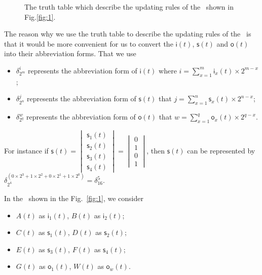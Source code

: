 \begin{example}
\begin{figure}[thpb]
      \caption{The truth table which describe the updating rules of the \BCN\ shown in Fig.\ref{fig:1}.}
      \label{fig:2}
   \end{figure}
  
   \label{exa:2}
\end{example}   

The reason why we use the truth table to describe the updating rules of the \BCN\ is that it would be more convenient for us to convert the $\mathsf{i}(t)$, $\mathsf{s}(t)$ and $\mathsf{o}(t)$ into their abbreviation forms. 
That we use 
\begin{itemize}
  \item $\delta^i_{2^m}$ represents the abbreviation form of $\mathsf{i}(t)$ where $i=\sum_{x=1}^m \mathsf{i}_{x}(t)\times 2^{m-x}$;
  \item $\delta^j_{2^n}$ represents the abbreviation form of $\mathsf{s}(t)$ that $j=\sum_{x=1}^n \mathsf{s}_{x}(t)\times 2^{n-x}$;
  \item $\delta^w_{2^q}$ represents the abbreviation form of $\mathsf{o}(t)$ that $w=\sum_{x=1}^q \mathsf{o}_{x}(t)\times 2^{q-x}$.
\end{itemize}

For instance if $\mathsf{s}(t)=\begin{vmatrix}\mathsf{s}_1(t)\\\mathsf{s}_2(t) \\ \mathsf{s}_3(t) \\\mathsf{s}_4(t)\end{vmatrix}=\begin{vmatrix}0\\1\\0\\1\end{vmatrix}$, then $\mathsf{s}(t)$ can be represented by $\delta^{(0\times2^3+1\times2^2+0\times2^1+1\times2^0)}_{2^4}=\delta^5_{16}$. 

In the \BCN\ shown in the Fig.~\ref{fig:1}, we consider 
\begin{itemize}
  \item $A(t)$ as $\mathsf{i}_{1}(t)$, $B(t)$ as $\mathsf{i}_{2}(t)$;
  \item $C(t)$ as $\mathsf{s}_{1}(t)$, $D(t)$ as $\mathsf{s}_{2}(t)$;
  \item $E(t)$ as $\mathsf{s}_{3}(t)$, $F(t)$ as $\mathsf{s}_{4}(t)$;
  \item $G(t)$ as $\mathsf{o}_{1}(t)$, $W(t)$ as $\mathsf{o}_{w}(t)$.
\end{itemize}

